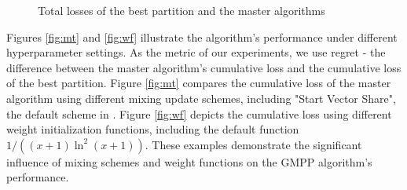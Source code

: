\documentclass{icorsdssv2024}
\begin{document}
\begin{figure}[H]
\caption{Total losses of the best partition and the master algorithms }
\end{figure}

Figures \ref{fig:mt} and \ref{fig:wf} illustrate the algorithm's performance under different hyperparameter settings.  
As the metric of our experiments, we use regret - the difference between the master algorithm's cumulative loss and the cumulative loss of the best partition. 
Figure \ref{fig:mt} compares the cumulative loss of the master algorithm using different mixing update schemes, including "Start Vector Share", the default scheme in \cite{article}. 
Figure \ref{fig:wf} depicts the cumulative loss using different weight initialization functions, including the default function $1 / ((x + 1)\ln^2(x + 1))$. 
These examples demonstrate the significant influence of mixing schemes and weight functions on the GMPP algorithm's performance.
\end{document}
